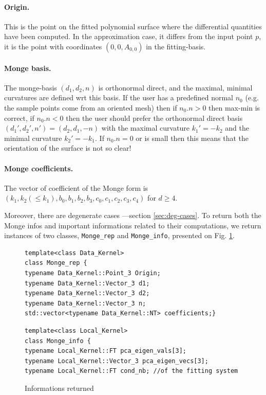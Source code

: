 \paragraph{Origin.} This is the point on the fitted polynomial surface
where the differential quantities have been computed. In the
approximation case, it differs from the input point $p$, it is the
point with coordinates $(0,0,A_{0,0})$ in the fitting-basis.

\paragraph{Monge basis.} The monge-basis $(d_1,d_2,n)$ is orthonormal
direct, and the maximal, minimal curvatures are defined wrt this
basis. If the user has a predefined normal $n_0$ (e.g. the sample
points come from an oriented mesh) then if $n_0 . n >0$ then max-min is
correct, if $n_0 . n <0$ then the user should prefer the orthonormal
direct basis $(d_1',d_2',n')=(d_2,d_1,-n)$ with the maximal curvature
$k_1'=-k_2$ and the minimal curvature $k_2'=-k_1$. If $n_0 . n =0$ or
is small then this means that the orientation of the surface is not so
clear!

\paragraph{Monge coefficients.}
The vector of coefficient of the Monge form is $(k_1, k_2 (\leq k_1),
b_0, b_1, b_2, b_3, c_0, c_1, c_2, c_3, c_4)$ for $d\geq 4$.

Moreover, there are degenerate cases ---section
\ref{sec:deg-cases}. To return both the Monge infos and important
informations related to their computations, we return instances of two
classes, {\tt Monge\_rep} and {\tt Monge\_info}, presented on
Fig. \ref{fig:outputs}.

\begin{figure}[H] 
\begin{center}
\begin{boxedminipage}[t]{14cm}
\begin{verbatim}
template<class Data_Kernel>
class Monge_rep { 
typename Data_Kernel::Point_3 Origin; 
typename Data_Kernel::Vector_3 d1; 
typename Data_Kernel::Vector_3 d2;
typename Data_Kernel::Vector_3 n; 
std::vector<typename Data_Kernel::NT> coefficients;}
\end{verbatim}

\begin{verbatim}
template<class Local_Kernel>
class Monge_info { 
typename Local_Kernel::FT pca_eigen_vals[3];
typename Local_Kernel::Vector_3 pca_eigen_vecs[3];
typename Local_Kernel::FT cond_nb; //of the fitting system  
\end{verbatim}
\end{boxedminipage}
\end{center}

\caption{Informations returned} 
\label{fig:outputs} 
\end{figure} 


